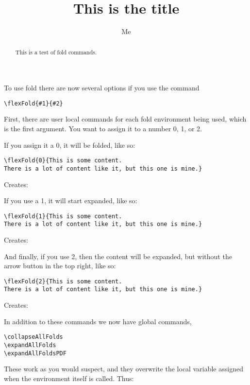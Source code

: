 \documentclass{ximera}
\title{This is the title}
\author{Me}
\begin{document}
\begin{abstract}
This is a test of fold commands.
\end{abstract}


To use fold there are now several options if you use the command 
\begin{verbatim}
\flexFold{#1}{#2}
\end{verbatim}

First, there are user local commands for each fold environment being used, which is the first argument. You want to assign it to a number 0, 1, or 2.

If you assign it a 0, it will be folded, like so:
\begin{verbatim}
\flexFold{0}{This is some content. 
There is a lot of content like it, but this one is mine.}
\end{verbatim}

Creates:

If you use a 1, it will start expanded, like so:

\begin{verbatim}
\flexFold{1}{This is some content. 
There is a lot of content like it, but this one is mine.}
\end{verbatim}

Creates:

And finally, if you use 2, then the content will be expanded, but without the arrow button in the top right, like so:
\begin{verbatim}
\flexFold{2}{This is some content. 
There is a lot of content like it, but this one is mine.}
\end{verbatim}

Creates:

In addition to these commands we now have global commands,
\begin{verbatim}
\collapseAllFolds
\expandAllFolds
\expandAllFoldsPDF
\end{verbatim}

These work as you would suspect, and they overwrite the local variable assigned when the environment itself is called. Thus:
\end{document}
